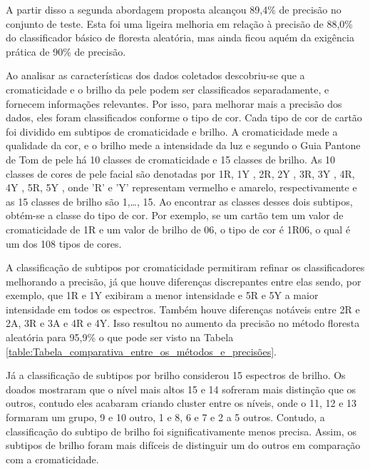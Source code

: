 A partir disso a segunda abordagem proposta alcançou 89,4\% de precisão no conjunto de teste. Esta foi uma ligeira melhoria em relação à precisão de 88,0\% do classificador básico de floresta aleatória, mas ainda ficou aquém da exigência prática de 90\% de precisão.

Ao analisar as características dos dados coletados descobriu-se que a cromaticidade e o brilho da pele podem ser classificados separadamente, e fornecem informações relevantes. Por isso, para melhorar mais a precisão  dos dados, eles foram classificados conforme o tipo de cor. Cada tipo de cor de cartão foi dividido em subtipos de cromaticidade e brilho. A cromaticidade mede a qualidade da cor, e o brilho mede a intensidade da luz e segundo o Guia Pantone de Tom de pele há 10 classes de cromaticidade e 15 classes de brilho. As 10 classes de cores de pele facial são denotadas por {1R, 1Y , 2R, 2Y , 3R, 3Y , 4R, 4Y , 5R, 5Y }, onde 'R' e 'Y' representam vermelho e amarelo, respectivamente e as 15 classes de brilho são {1,…, 15}. Ao encontrar as classes desses dois subtipos, obtém-se a classe do tipo de cor. Por exemplo, se um cartão tem um valor de cromaticidade de 1R e um valor de brilho de 06, o tipo de cor é 1R06, o qual é um dos 108 tipos de cores.

A classificação de subtipos por cromaticidade permitiram refinar os classificadores melhorando a precisão, já que houve diferenças discrepantes entre elas sendo, por exemplo, que 1R e 1Y exibiram a menor intensidade e 5R e 5Y a maior intensidade em todos os espectros. Também houve diferenças notáveis entre 2R e 2A, 3R e 3A e 4R e 4Y. Isso resultou no aumento da precisão no método floresta aleatória para 95,9\% o que pode ser visto na Tabela \ref{table:Tabela_comparativa_entre_os_métodos_e_precisões}.

Já a classificação de subtipos por brilho considerou 15 espectros de brilho. Os doados mostraram que o nível mais altos 15 e 14 sofreram mais distinção que os outros, contudo eles acabaram criando cluster entre os níveis, onde o 11, 12 e 13 formaram um grupo, 9 e 10 outro, 1 e 8, 6 e 7 e 2 a 5 outros. Contudo, a classificação do subtipo de brilho foi significativamente menos precisa. Assim, os subtipos de brilho foram mais difíceis de distinguir um do outros em comparação com a cromaticidade.


